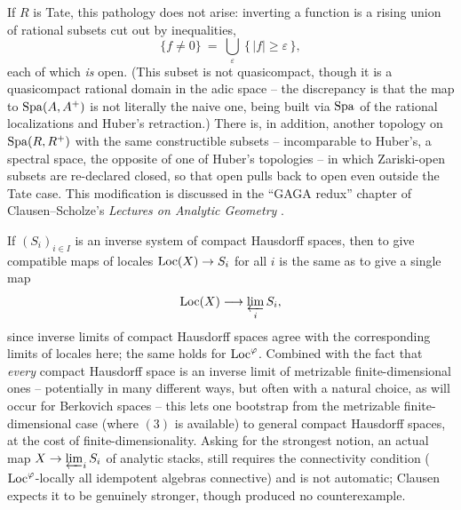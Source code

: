 \begin{remark}
\label{rmk:22:tate-fix}
If $R$ is Tate, this pathology does not arise: inverting a function is a rising
union of rational subsets cut out by inequalities,
\begin{equation*}
\{f\neq0\}\ =\ \bigcup_{\varepsilon}\ \{\,|f|\ge\varepsilon\,\},
\end{equation*}
each of which \emph{is} open. (This subset is not quasicompact, though it is a
quasicompact rational domain in the adic space -- the discrepancy is that the
map to $\operatorname{Spa}(A,A^+)$ is not literally the naive one, being built via
$\operatorname{Spa}$ of the rational localizations and Huber's retraction.) There is, in
addition, another topology on $\operatorname{Spa}(R,R^+)$ with the same constructible subsets
-- incomparable to Huber's, a spectral space, the opposite of one of Huber's
topologies -- in which Zariski-open subsets are re-declared closed, so that
open pulls back to open even outside the Tate case. This modification is
discussed in the ``GAGA redux'' chapter of Clausen--Scholze's
\emph{Lectures on Analytic Geometry} \cite{scholze2020analytic}.
\end{remark}

\begin{remark}
\label{rmk:22:inverse-limits}
If $(S_i)_{i\in I}$ is an inverse system of compact Hausdorff spaces, then to
give compatible maps of locales $\operatorname{Loc}(X)\to S_i$ for all $i$ is the same as to
give a single map
\begin{equation*}
\operatorname{Loc}(X)\longrightarrow \varprojlim_i S_i ,
\end{equation*}
since inverse limits of compact Hausdorff spaces agree with the corresponding
limits of locales here; the same holds for $\operatorname{Loc}^{\varphi}$. Combined with the
fact that \emph{every} compact Hausdorff space is an inverse limit of
metrizable finite-dimensional ones -- potentially in many different ways, but
often with a natural choice, as will occur for Berkovich spaces -- this lets
one bootstrap from the metrizable finite-dimensional case (where $(3)$ is
available) to general compact Hausdorff spaces, at the cost of
finite-dimensionality. Asking for the strongest notion, an actual map
$X\to\varprojlim_i S_i$ of analytic stacks, still requires the connectivity
condition ($\operatorname{Loc}^{\varphi}$-locally all idempotent algebras connective) and is
not automatic; Clausen expects it to be genuinely stronger, though produced no
counterexample.
\end{remark}


